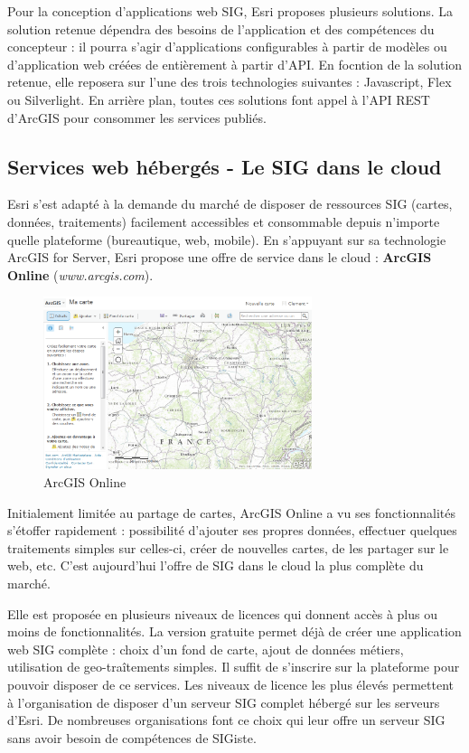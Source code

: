 \documentclass[11pt]{article}
\begin{document}
Pour la conception d'applications web SIG, Esri proposes plusieurs solutions. La solution retenue dépendra des besoins de l'application et des compétences du concepteur : il pourra s'agir d'applications configurables à partir de modèles ou d'application web créées de entièrement à partir d'API. En focntion de la solution retenue, elle reposera sur l'une des trois technologies suivantes : Javascript, Flex ou Silverlight. En arrière plan, toutes ces solutions font appel à l'API REST d'ArcGIS pour consommer les services publiés.


\subsection{Services web hébergés - Le SIG dans le cloud}
Esri s'est adapté à la demande du marché de disposer de ressources SIG (cartes, données, traitements) facilement accessibles et consommable depuis n'importe quelle plateforme (bureautique, web, mobile). En s'appuyant sur sa technologie ArcGIS for Server, Esri propose une offre de service dans le cloud : \textbf{ArcGIS Online} (\textit{www.arcgis.com}).

\begin{figure}[H]
	\center \includegraphics[width=0.7\textwidth]{img/cours/arcgis_online.png} 
	\caption{ArcGIS Online}
\end{figure}

Initialement limitée au partage de cartes, ArcGIS Online a vu ses fonctionnalités s'étoffer rapidement : possibilité d'ajouter ses propres données, effectuer quelques traitements simples sur celles-ci, créer de nouvelles cartes, de les partager sur le web, etc. C'est aujourd'hui l'offre de SIG dans le cloud la plus complète du marché.

Elle est proposée en plusieurs niveaux de licences qui donnent accès à plus ou moins de fonctionnalités. La version gratuite permet déjà de créer une application web SIG complète : choix d'un fond de carte, ajout de données métiers, utilisation de geo-traîtements simples. Il suffit de s'inscrire sur la plateforme pour pouvoir disposer de ce services. Les niveaux de licence les plus élevés permettent à l'organisation de disposer d'un serveur SIG complet hébergé sur les serveurs d'Esri. De nombreuses organisations font ce choix qui leur offre un serveur SIG sans avoir besoin de compétences de SIGiste.
\end{document}
